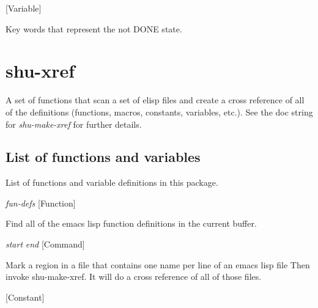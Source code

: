 \vspace{1em}
\noindent
{}
\usebox{\funcname}
 \hfill [Variable]

\begin{doc-string}
Key words that represent the not DONE state.
\end{doc-string}

\eject
\section{shu-xref}



A set of functions that scan a set of elisp files and create a cross reference
of all of the definitions (functions, macros, constants, variables, etc.).
See the doc string for \emph{shu-make-xref} for further details.


\subsection{List of functions and variables}

List of functions and variable definitions in this package.



\vspace{1em}
\noindent
{}
\usebox{\funcname}\emph{fun-defs}
 \hfill [Function]

\begin{doc-string}
Find all of the emacs lisp function definitions in the current buffer.
\end{doc-string}

\vspace{1em}
\noindent
{}
\usebox{\funcname}\emph{start} \emph{end}
 \hfill [Command]

\begin{doc-string}
Mark a region in a file that contains one name per line of an emacs lisp file
Then invoke shu-make-xref.  It will do a cross reference of all of those files.
\end{doc-string}

\vspace{1em}
\noindent
{}
\usebox{\funcname}
 \hfill [Constant]

